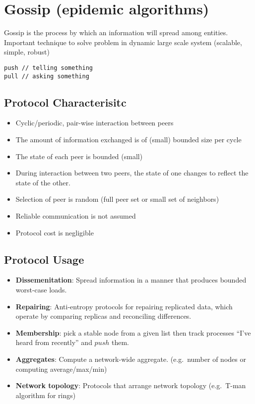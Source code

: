 \section{Gossip (epidemic algorithms)}

Gossip is the process by which an information will spread among
entities. Important technique to solve problem in dynamic large scale system
(scalable, simple, robust)

\begin{lstlisting}
push // telling something
pull // asking something
\end{lstlisting}

\subsection{Protocol Characterisitc}
\begin{itemize}
	\item Cyclic/periodic, pair-wise interaction between peers
	\item The amount of information exchanged is of (small)
	bounded size per cycle
	\item The state of each peer is bounded (small)
	\item During interaction between two peers, the state of one changes to
	reflect the state of the other.
	\item Selection of peer is random (full peer set or small set of neighbors)
	\item Reliable communication is not assumed
	\item Protocol cost is negligible
\end{itemize}

\subsection{Protocol Usage}
\begin{itemize}
	\item \textbf{Dissemenitation}: Spread information in a manner that produces
	bounded worst-case loads.
	\item \textbf{Repairing}: Anti-entropy protocols for repairing replicated data,
	which operate by comparing replicas and reconciling differences.
	\item \textbf{Membership}: pick a stable node from a given list then track
    processes \enquote{I've heard from recently} and $push$ them.
	\item \textbf{Aggregates}: Compute a network-wide aggregate. (e.g.\ number of nodes or
	computing average/max/min)
	\item \textbf{Network topology}: Protocols that arrange network topology
    (e.g.\ T-man algorithm for rings)
\end{itemize}

